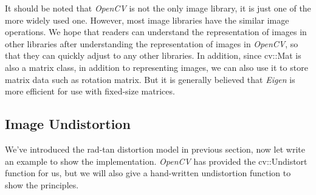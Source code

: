It should be noted that \textit{OpenCV} is not the only image library, it is just one of the more widely used one. However, most image libraries have the similar image operations. We hope that readers can understand the representation of images in other libraries after understanding the representation of images in \textit{OpenCV}, so that they can quickly adjust to any other libraries. In addition, since cv::Mat is also a matrix class, in addition to representing images, we can also use it to store matrix data such as rotation matrix. But it is generally believed that \textit{Eigen} is more efficient for use with fixed-size matrices.

\subsection{Image Undistortion}
We've introduced the rad-tan distortion model in previous section, now let write an example to show the implementation. \textit{OpenCV} has provided the cv::Undistort function for us, but we will also give a hand-written undistortion function to show the principles.

